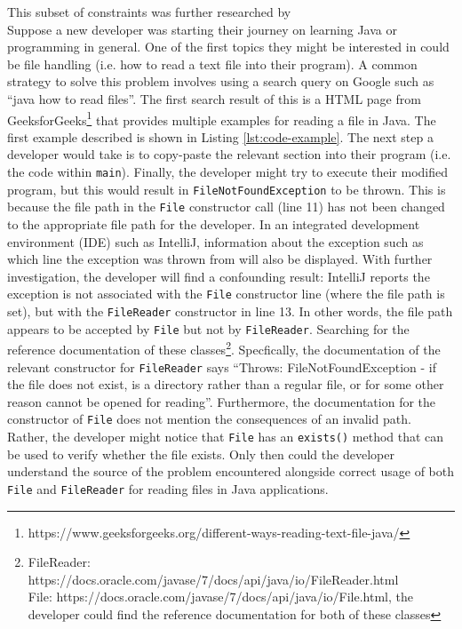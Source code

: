 This subset of constraints was further researched by \citeauthor{caveat-knowledge-graph}
\\

Suppose a new developer was starting their journey on learning Java or programming in general. One of the first topics they might be interested in could be file handling (i.e. how to read a text file into their program). A common strategy to solve this problem involves using a search query on Google such as ``java how to read files''. The first search result of this is a HTML page from GeeksforGeeks\footnote{https://www.geeksforgeeks.org/different-ways-reading-text-file-java/} that provides multiple examples for reading a file in Java. The first example described is shown in Listing  \ref{lst:code-example}. The next step a developer would take is to copy-paste the relevant section into their program (i.e. the code within \lstinline{main}). Finally, the developer might try to execute their modified program, but this would result in \lstinline{FileNotFoundException} to be thrown. This is because the file path in the \lstinline{File} constructor call (line 11) has not been changed to the appropriate file path for the developer. In an integrated development environment (IDE) such as IntelliJ,  information about the exception such as which line the exception was thrown from will also be displayed. With further investigation, the developer will find a confounding result: IntelliJ reports the exception is not associated with the \lstinline{File} constructor line (where the file path is set), but with the \lstinline{FileReader} constructor in line 13. In other words, the file path appears to be accepted by \lstinline{File} but not by \lstinline{FileReader}. Searching for the reference documentation of these classes\footnote{FileReader: https://docs.oracle.com/javase/7/docs/api/java/io/FileReader.html \\\indent File: https://docs.oracle.com/javase/7/docs/api/java/io/File.html, the developer could find the reference documentation for both of these classes}. Specfically, the documentation of the relevant constructor for \lstinline{FileReader} says ``Throws: FileNotFoundException - if the file does not exist, is a directory rather than a regular file, or for some other reason cannot be opened for reading''. Furthermore, the documentation for the constructor of \lstinline{File} does not mention the consequences of an invalid path. Rather, the developer might notice that \lstinline{File} has an \lstinline{exists()} method that can be used to verify whether the file exists. Only then could the developer understand the source of the problem encountered alongside correct usage of both \lstinline{File} and \lstinline{FileReader} for reading files in Java applications.

